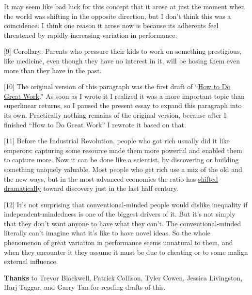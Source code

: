 It may seem like bad luck for this concept that it arose at just the
moment when the world was shifting in the opposite direction, but I
don't think this was a coincidence. I think one reason it arose now is
because its adherents feel threatened by rapidly increasing variation in
performance.

{[}9{]} Corollary: Parents who pressure their kids to work on something
prestigious, like medicine, even though they have no interest in it,
will be hosing them even more than they have in the past.

{[}10{]} The original version of this paragraph was the first draft of
``\href{greatwork.html}{How to Do Great Work}.'' As soon as I wrote it I
realized it was a more important topic than superlinear returns, so I
paused the present essay to expand this paragraph into its own.
Practically nothing remains of the original version, because after I
finished ``How to Do Great Work'' I rewrote it based on that.

{[}11{]} Before the Industrial Revolution, people who got rich usually
did it like emperors: capturing some resource made them more powerful
and enabled them to capture more. Now it can be done like a scientist,
by discovering or building something uniquely valuable. Most people who
get rich use a mix of the old and the new ways, but in the most advanced
economies the ratio has \href{richnow.html}{shifted dramatically} toward
discovery just in the last half century.

{[}12{]} It's not surprising that conventional-minded people would
dislike inequality if independent-mindedness is one of the biggest
drivers of it. But it's not simply that they don't want anyone to have
what they can't. The conventional-minded literally can't imagine what
it's like to have novel ideas. So the whole phenomenon of great
variation in performance seems unnatural to them, and when they
encounter it they assume it must be due to cheating or to some malign
external influence.

\textbf{Thanks} to Trevor Blackwell, Patrick Collison, Tyler Cowen,
Jessica Livingston, Harj Taggar, and Garry Tan for reading drafts of
this.
